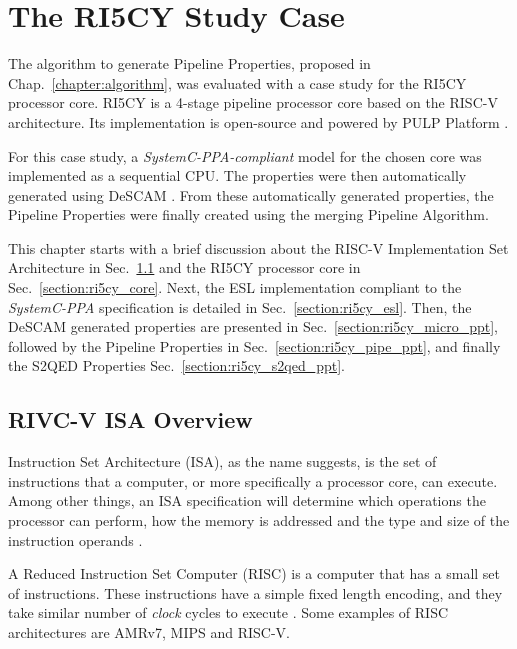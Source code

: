 \chapter{The RI5CY Study Case}

The algorithm to generate Pipeline Properties, proposed in Chap.~\ref{chapter:algorithm},  was evaluated with a case study for the RI5CY processor core. RI5CY is a 4-stage pipeline processor core based on the RISC-V architecture. Its implementation is open-source and powered by PULP Platform \cite{pulp}.

For this case study, a \textit{SystemC-PPA-compliant} \cite{paper-pdd} model for the chosen core was implemented as a sequential CPU. The properties were then automatically generated using DeSCAM \cite{descam}. From these automatically generated properties, the Pipeline Properties were finally created using the merging Pipeline Algorithm. 

This chapter starts with a brief discussion about the RISC-V Implementation Set Architecture in Sec.~\ref{section:riscv} and the RI5CY processor core in Sec.~\ref{section:ri5cy_core}. Next, the ESL implementation compliant to the \textit{SystemC-PPA} specification is detailed in Sec.~\ref{section:ri5cy_esl}. Then, the DeSCAM generated properties are presented in Sec.~\ref{section:ri5cy_micro_ppt}, followed by the Pipeline Properties in Sec.~\ref{section:ri5cy_pipe_ppt}, and finally the S2QED Properties Sec.~\ref{section:ri5cy_s2qed_ppt}.

\section{RIVC-V ISA Overview}
\label{section:riscv}
Instruction Set Architecture (ISA), as the name suggests, is the set of instructions that a computer, or more specifically a processor core, can execute. Among other things, an ISA specification will determine which operations the processor can perform, how the memory is addressed and the type and size of the instruction operands \cite{book-comp-arch}.

A Reduced Instruction Set Computer (RISC) is a computer that has a small set of instructions. These instructions have a simple fixed length encoding, and they take similar number of \textit{clock} cycles to execute \cite{book-comp-arch}. Some examples of RISC architectures are AMRv7, MIPS and RISC-V.

